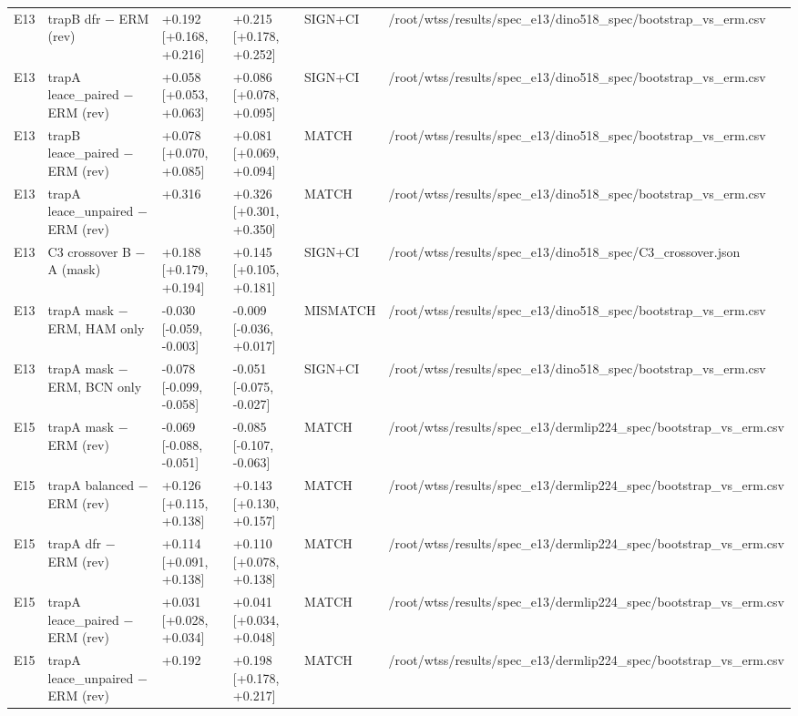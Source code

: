 {{\begin{longtable}[]{@{}llllll@{}}
E13 & trapB dfr − ERM (rev) & +0.192 {[}+0.168, +0.216{]} & +0.215 {[}+0.178, +0.252{]} & SIGN+CI & /root/wtss/results/spec\_e13/dino518\_spec/bootstrap\_vs\_erm.csv \\
E13 & trapA leace\_paired − ERM (rev) & +0.058 {[}+0.053, +0.063{]} & +0.086 {[}+0.078, +0.095{]} & SIGN+CI & /root/wtss/results/spec\_e13/dino518\_spec/bootstrap\_vs\_erm.csv \\
E13 & trapB leace\_paired − ERM (rev) & +0.078 {[}+0.070, +0.085{]} & +0.081 {[}+0.069, +0.094{]} & MATCH & /root/wtss/results/spec\_e13/dino518\_spec/bootstrap\_vs\_erm.csv \\
E13 & trapA leace\_unpaired − ERM (rev) & +0.316 & +0.326 {[}+0.301, +0.350{]} & MATCH & /root/wtss/results/spec\_e13/dino518\_spec/bootstrap\_vs\_erm.csv \\
E13 & C3 crossover B − A (mask) & +0.188 {[}+0.179, +0.194{]} & +0.145 {[}+0.105, +0.181{]} & SIGN+CI & /root/wtss/results/spec\_e13/dino518\_spec/C3\_crossover.json \\
E13 & trapA mask − ERM, HAM only & -0.030 {[}-0.059, -0.003{]} & -0.009 {[}-0.036, +0.017{]} & MISMATCH & /root/wtss/results/spec\_e13/dino518\_spec/bootstrap\_vs\_erm.csv \\
E13 & trapA mask − ERM, BCN only & -0.078 {[}-0.099, -0.058{]} & -0.051 {[}-0.075, -0.027{]} & SIGN+CI & /root/wtss/results/spec\_e13/dino518\_spec/bootstrap\_vs\_erm.csv \\
E15 & trapA mask − ERM (rev) & -0.069 {[}-0.088, -0.051{]} & -0.085 {[}-0.107, -0.063{]} & MATCH & /root/wtss/results/spec\_e13/dermlip224\_spec/bootstrap\_vs\_erm.csv \\
E15 & trapA balanced − ERM (rev) & +0.126 {[}+0.115, +0.138{]} & +0.143 {[}+0.130, +0.157{]} & MATCH & /root/wtss/results/spec\_e13/dermlip224\_spec/bootstrap\_vs\_erm.csv \\
E15 & trapA dfr − ERM (rev) & +0.114 {[}+0.091, +0.138{]} & +0.110 {[}+0.078, +0.138{]} & MATCH & /root/wtss/results/spec\_e13/dermlip224\_spec/bootstrap\_vs\_erm.csv \\
E15 & trapA leace\_paired − ERM (rev) & +0.031 {[}+0.028, +0.034{]} & +0.041 {[}+0.034, +0.048{]} & MATCH & /root/wtss/results/spec\_e13/dermlip224\_spec/bootstrap\_vs\_erm.csv \\
E15 & trapA leace\_unpaired − ERM (rev) & +0.192 & +0.198 {[}+0.178, +0.217{]} & MATCH & /root/wtss/results/spec\_e13/dermlip224\_spec/bootstrap\_vs\_erm.csv \\
\end{longtable}
}

}

